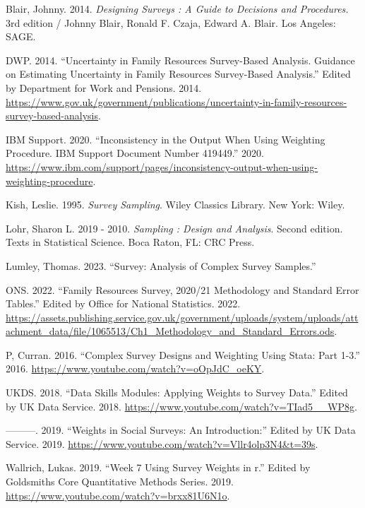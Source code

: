 \documentclass[
  14,
  a4paper,
  DIV=11,
  numbers=noendperiod]{scrartcl}
\newlength{\cslhangindent}
\newlength{\cslentryspacingunit} %
\newenvironment{CSLReferences}[2] %
 {%
  \setlength{\parindent}{0pt}
  \ifodd #1
  \let\oldpar\par
  \def\par{\hangindent=\cslhangindent\oldpar}
  \fi
  \setlength{\parskip}{#2\cslentryspacingunit}
 }%
 {}
\begin{document}
\hypertarget{refs}{}
\begin{CSLReferences}{1}{0}
\leavevmode{}%
Blair, Johnny. 2014. \emph{Designing Surveys : A Guide to Decisions and
Procedures.} 3rd edition / Johnny Blair, Ronald F. Czaja, Edward A.
Blair. Los Angeles: SAGE.

\leavevmode{}%
DWP. 2014. {``Uncertainty in Family Resources Survey-Based Analysis.
Guidance on Estimating Uncertainty in Family Resources Survey-Based
Analysis.''} Edited by Department for Work and Pensions. 2014.
\url{https://www.gov.uk/government/publications/uncertainty-in-family-resources-survey-based-analysis}.

\leavevmode{}%
IBM Support. 2020. {``Inconsistency in the Output When Using Weighting
Procedure. IBM Support Document Number 419449.''} 2020.
\url{https://www.ibm.com/support/pages/inconsistency-output-when-using-weighting-procedure}.

\leavevmode{}%
Kish, Leslie. 1995. \emph{Survey Sampling}. Wiley Classics Library. New
York: Wiley.

\leavevmode{}%
Lohr, Sharon L. 2019 - 2010. \emph{Sampling : Design and Analysis}.
Second edition. Texts in Statistical Science. Boca Raton, FL: CRC Press.

\leavevmode{}%
Lumley, Thomas. 2023. {``Survey: Analysis of Complex Survey Samples.''}

\leavevmode{}%
ONS. 2022. {``Family Resources Survey, 2020/21 Methodology and Standard
Error Tables.''} Edited by Office for National Statistics. 2022.
\url{https://assets.publishing.service.gov.uk/government/uploads/system/uploads/attachment_data/file/1065513/Ch1_Methodology_and_Standard_Errors.ods}.

\leavevmode{}%
P, Curran. 2016. {``Complex Survey Designs and Weighting Using Stata:
Part 1-3.''} 2016. \url{https://www.youtube.com/watch?v=oOpJdC_oeKY}.

\leavevmode{}%
UKDS. 2018. {``Data Skills Modules: Applying Weights to Survey Data.''}
Edited by UK Data Service. 2018.
\url{https://www.youtube.com/watch?v=TIad5__WP8g}.

\leavevmode{}%
---------. 2019. {``Weights in Social Surveys: An Introduction:''}
Edited by UK Data Service. 2019.
\url{https://www.youtube.com/watch?v=Vllr4olp3N4\&t=39s}.

\leavevmode{}%
Wallrich, Lukas. 2019. {``Week 7 Using Survey Weights in r.''} Edited by
Goldsmiths Core Quantitative Methods Series. 2019.
\url{https://www.youtube.com/watch?v=brxx81U6N1o}.

\end{CSLReferences}
\end{document}
